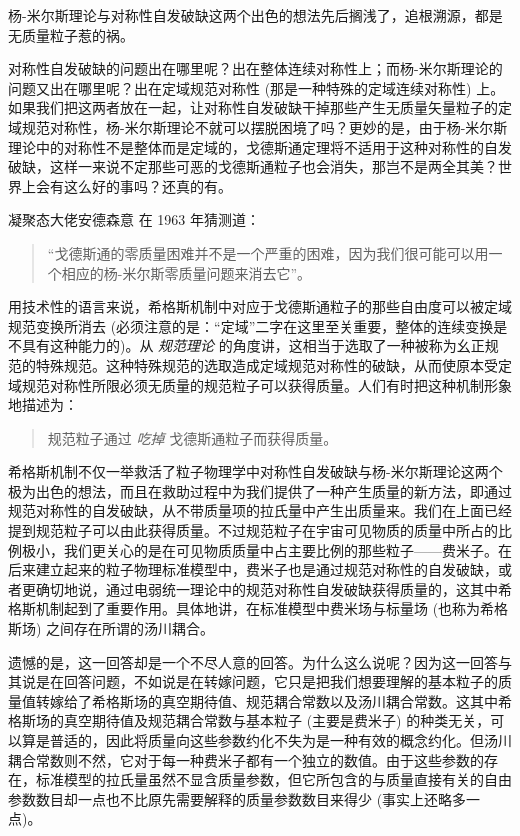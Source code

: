 \documentclass[oneside,a4paper,openany,11pt]{ctexbook}
\begin{document}
杨-米尔斯理论与对称性自发破缺这两个出色的想法先后搁浅了，追根溯源，都是无质量粒子惹的祸。

对称性自发破缺的问题出在哪里呢？出在整体连续对称性上；而杨-米尔斯理论的问题又出在哪里呢？出在定域规范对称性 (那是一种特殊的定域连续对称性) 上。如果我们把这两者放在一起，让对称性自发破缺干掉那些产生无质量矢量粒子的定域规范对称性，杨-米尔斯理论不就可以摆脱困境了吗？更妙的是，由于杨-米尔斯理论中的对称性不是整体而是定域的，戈德斯通定理将不适用于这种对称性的自发破缺，这样一来说不定那些可恶的戈德斯通粒子也会消失，那岂不是两全其美？世界上会有这么好的事吗？还真的有。


凝聚态大佬安德森意 在 1963 年猜测道：

\begin{quote}
    “戈德斯通的零质量困难并不是一个严重的困难，因为我们很可能可以用一个相应的杨-米尔斯零质量问题来消去它”。
\end{quote}

用技术性的语言来说，希格斯机制中对应于戈德斯通粒子的那些自由度可以被定域规范变换所消去 (必须注意的是：“定域”二字在这里至关重要，整体的连续变换是不具有这种能力的)。从 \emph{规范理论} 的角度讲，这相当于选取了一种被称为幺正规范的特殊规范。这种特殊规范的选取造成定域规范对称性的破缺，从而使原本受定域规范对称性所限必须无质量的规范粒子可以获得质量。人们有时把这种机制形象地描述为：

\begin{quote}
    规范粒子通过 \emph{吃掉} 戈德斯通粒子而获得质量。
\end{quote}

希格斯机制不仅一举救活了粒子物理学中对称性自发破缺与杨-米尔斯理论这两个极为出色的想法，而且在救助过程中为我们提供了一种产生质量的新方法，即通过规范对称性的自发破缺，从不带质量项的拉氏量中产生出质量来。我们在上面已经提到规范粒子可以由此获得质量。不过规范粒子在宇宙可见物质的质量中所占的比例极小，我们更关心的是在可见物质质量中占主要比例的那些粒子——费米子。在后来建立起来的粒子物理标准模型中，费米子也是通过规范对称性的自发破缺，或者更确切地说，通过电弱统一理论中的规范对称性自发破缺获得质量的，这其中希格斯机制起到了重要作用。具体地讲，在标准模型中费米场与标量场 (也称为希格斯场) 之间存在所谓的汤川耦合。

遗憾的是，这一回答却是一个不尽人意的回答。为什么这么说呢？因为这一回答与其说是在回答问题，不如说是在转嫁问题，它只是把我们想要理解的基本粒子的质量值转嫁给了希格斯场的真空期待值、规范耦合常数以及汤川耦合常数。这其中希格斯场的真空期待值及规范耦合常数与基本粒子 (主要是费米子) 的种类无关，可以算是普适的，因此将质量向这些参数约化不失为是一种有效的概念约化。但汤川耦合常数则不然，它对于每一种费米子都有一个独立的数值。由于这些参数的存在，标准模型的拉氏量虽然不显含质量参数，但它所包含的与质量直接有关的自由参数数目却一点也不比原先需要解释的质量参数数目来得少 (事实上还略多一点)。
\end{document}
